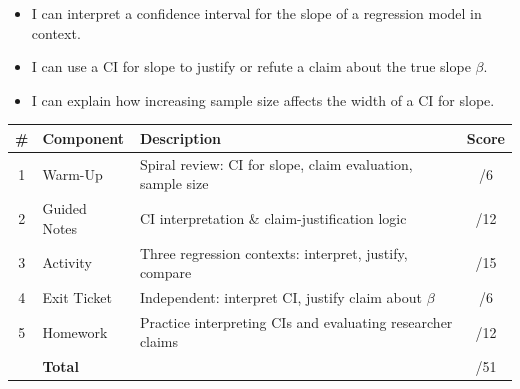 \documentclass[10pt]{article}
\begin{document}

\vspace{2.4cm}
\namedateperiod

\begin{learningtargetbox}
\begin{itemize}
    \item I can interpret a confidence interval for the slope of a regression model in context.
    \item I can use a CI for slope to justify or refute a claim about the true slope $\beta$.
    \item I can explain how increasing sample size affects the width of a CI for slope.
\end{itemize}
\end{learningtargetbox}

\begin{tocbox}
\renewcommand{\arraystretch}{1.5}
\begin{tabularx}{\linewidth}{clXc}
    \textbf{\#} & \textbf{Component} & \textbf{Description} & \textbf{Score} \\
    \hline
    1 & Warm-Up      & Spiral review: CI for slope, claim evaluation, sample size & \hfill/6 \\
    2 & Guided Notes & CI interpretation \& claim-justification logic              & \hfill/12 \\
    3 & Activity     & Three regression contexts: interpret, justify, compare      & \hfill/15 \\
    4 & Exit Ticket  & Independent: interpret CI, justify claim about $\beta$       & \hfill/6 \\
    5 & Homework     & Practice interpreting CIs and evaluating researcher claims  & \hfill/12 \\
    \hline
       & \multicolumn{2}{l}{\textbf{Total}} & \hfill/51 \\
\end{tabularx}
\end{tocbox}
\end{document}
